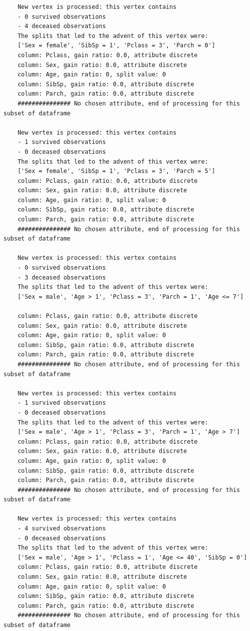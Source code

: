 \documentclass[12pt]{article}
\begin{document}
\begin{verbatim}
	New vertex is processed: this vertex contains
	- 0 survived observations
	- 4 deceased observations
	The splits that led to the advent of this vertex were:
	['Sex = female', 'SibSp = 1', 'Pclass = 3', 'Parch = 0']
	column: Pclass, gain ratio: 0.0, attribute discrete
	column: Sex, gain ratio: 0.0, attribute discrete
	column: Age, gain ratio: 0, split value: 0
	column: SibSp, gain ratio: 0.0, attribute discrete
	column: Parch, gain ratio: 0.0, attribute discrete
	############### No chosen attribute, end of processing for this subset of dataframe
	
	New vertex is processed: this vertex contains
	- 1 survived observations
	- 0 deceased observations
	The splits that led to the advent of this vertex were:
	['Sex = female', 'SibSp = 1', 'Pclass = 3', 'Parch = 5']
	column: Pclass, gain ratio: 0.0, attribute discrete
	column: Sex, gain ratio: 0.0, attribute discrete
	column: Age, gain ratio: 0, split value: 0
	column: SibSp, gain ratio: 0.0, attribute discrete
	column: Parch, gain ratio: 0.0, attribute discrete
	############### No chosen attribute, end of processing for this subset of dataframe
	
	New vertex is processed: this vertex contains
	- 0 survived observations
	- 3 deceased observations
	The splits that led to the advent of this vertex were:
	['Sex = male', 'Age > 1', 'Pclass = 3', 'Parch = 1', 'Age <= 7']
	
	column: Pclass, gain ratio: 0.0, attribute discrete
	column: Sex, gain ratio: 0.0, attribute discrete
	column: Age, gain ratio: 0, split value: 0
	column: SibSp, gain ratio: 0.0, attribute discrete
	column: Parch, gain ratio: 0.0, attribute discrete
	############### No chosen attribute, end of processing for this subset of dataframe
	
	New vertex is processed: this vertex contains
	- 1 survived observations
	- 0 deceased observations
	The splits that led to the advent of this vertex were:
	['Sex = male', 'Age > 1', 'Pclass = 3', 'Parch = 1', 'Age > 7']
	column: Pclass, gain ratio: 0.0, attribute discrete
	column: Sex, gain ratio: 0.0, attribute discrete
	column: Age, gain ratio: 0, split value: 0
	column: SibSp, gain ratio: 0.0, attribute discrete
	column: Parch, gain ratio: 0.0, attribute discrete
	############### No chosen attribute, end of processing for this subset of dataframe
	
	New vertex is processed: this vertex contains
	- 4 survived observations
	- 0 deceased observations
	The splits that led to the advent of this vertex were:
	['Sex = male', 'Age > 1', 'Pclass = 1', 'Age <= 40', 'SibSp = 0']
	column: Pclass, gain ratio: 0.0, attribute discrete
	column: Sex, gain ratio: 0.0, attribute discrete
	column: Age, gain ratio: 0, split value: 0
	column: SibSp, gain ratio: 0.0, attribute discrete
	column: Parch, gain ratio: 0.0, attribute discrete
	############### No chosen attribute, end of processing for this subset of dataframe
	

\end{verbatim}
\end{document}
